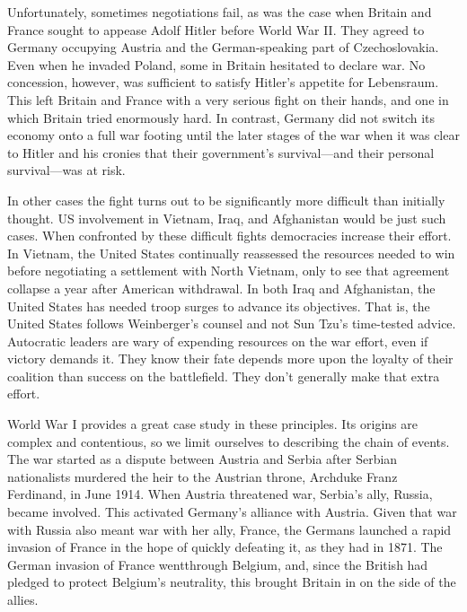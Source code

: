 \documentclass[10pt]{article}
\begin{document}
{\large Unfortunately, sometimes negotiations fail, as was the case when Britain
and France sought to appease Adolf Hitler before World War II. They agreed to
Germany occupying Austria and the German-speaking part of Czechoslovakia. Even
when he invaded Poland, some in Britain hesitated to declare war. No concession,
however, was sufficient to satisfy Hitler's appetite for Lebensraum. This left
Britain and France with a very serious fight on their hands, and one in which
Britain tried enormously hard. In contrast, Germany did not switch its economy
onto a full war footing until the later stages of the war when it was clear to
Hitler and his cronies that their government's survival---and their personal
survival---was at risk.}

{\large In other cases the fight turns out to be significantly more difficult
than initially thought. US involvement in Vietnam, Iraq, and Afghanistan would be
just such cases. When confronted by these difficult fights democracies increase
their effort. In Vietnam, the United States continually reassessed the resources
needed to win before negotiating a settlement with North Vietnam, only to see
that agreement collapse a year after American withdrawal. In both Iraq and
Afghanistan, the United States has needed troop surges to advance its objectives.
That is, the United States follows Weinberger's counsel and not Sun Tzu's
time-tested advice. Autocratic leaders are wary of expending resources on the war
effort, even if victory demands it. They know their fate depends more upon the
loyalty of their coalition than success on the battlefield. They don't generally
make that extra effort.}

{\large World War I provides a great case study in these principles. Its origins
are complex and contentious, so we limit ourselves to describing the chain of
events. The war started as a dispute between Austria and Serbia after Serbian
nationalists murdered the heir to the Austrian throne, Archduke Franz Ferdinand,
in June 1914. When Austria threatened war, Serbia's ally, Russia, became
involved. This activated Germany's alliance with Austria. Given that war with
Russia also meant war with her ally, France, the Germans launched a rapid
invasion of France in the hope of quickly defeating it, as they had in 1871. The
German invasion of France wentthrough Belgium, and, since the British had pledged
to protect Belgium's neutrality, this brought Britain in on the side of the
allies.}
\end{document}
